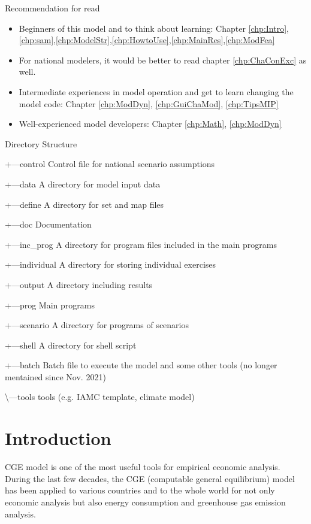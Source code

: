 \documentclass[10pt,a4paper,titlepage,dvipdfmx]{book}
\begin{document}
{\large Recommendation for read}

\begin{itemize}
  \item Beginners of this model and to think about learning: Chapter \ref{chp:Intro},\ref{chp:sam},\ref{chp:ModelStr},\ref{chp:HowtoUse},\ref{chp:MainRes},\ref{chp:ModFea}
  \item For national modelers, it would be better to read chapter \ref{chp:ChaConExc} as well.
  \item Intermediate experiences in model operation and get to learn changing the model code: Chapter \ref{chp:ModDyn}, \ref{chp:GuiChaMod}, \ref{chp:TipsMIP}
  \item Well-experienced model developers: Chapter \ref{chp:Math}, \ref{chp:ModDyn}
\end{itemize}

Directory Structure

{\textbar}   

+---control    Control file for national scenario assumptions

+---data     A directory for model input data

+---define    A directory for set and map files

+---doc     Documentation

+---inc\_prog    A directory for program files included in the main programs

+---individual    A directory for storing individual exercises

+---output    A directory including results

+---prog     Main programs

+---scenario    A directory for programs of scenarios

+---shell    A directory for shell script

+---batch    Batch file to execute the model and some other tools (no longer mentained since Nov. 2021) 

\textbackslash ---tools     tools (e.g. IAMC template, climate model)


\tableofcontents

\listoffigures

\listoftables

\chapter{Introduction\label{chp:Intro}}

 CGE model is one of the most useful tools for empirical economic analysis. During the last few decades, the CGE (computable general equilibrium) model has been applied to various countries and to the whole world for not only economic analysis but also energy consumption and greenhouse gas emission analysis. 
\end{document}
